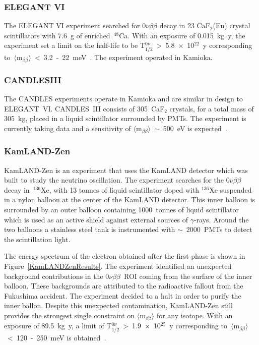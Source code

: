 \documentclass[main.tex]{subfiles}
\begin{document}
\subsubsection{ELEGANT VI}


\NI The ELEGANT VI experiment searched for 0$\nu\beta\beta$ decay in 23 CaF$_\text{2}$(Eu) crystal scintillators with 7.6~g of enriched~$^{\text{48}}$Ca. With an exposure of 0.015~kg~y, the experiment set a limit on the half-life to be T$_{\text{1/2}}^{0\nu}$~>~5.8~$\times$~10$^{\text{22}}$~y corresponding to~$\langle \text{m}_{\beta\beta} \rangle$~<~3.2~-~22~meV~\cite{ELEGANTVI}. The experiment operated in Kamioka. \\


\subsubsection{CANDLESIII}


\NI The CANDLES experiments operate in Kamioka and are similar in design to ELEGANT~VI. CANDLES~III consists of 305~CaF$_\text{2}$ crystals, for a total mass of 305~kg, placed in a liquid scintillator surrounded by PMTs. The experiment is currently taking data and a sensitivity of $\langle \text{m}_{\beta\beta} \rangle$~$\sim$~500~eV is expected~\cite{CANDLESIII}.


\subsubsection{KamLAND-Zen}


\NI KamLAND-Zen is an experiment that uses the KamLAND detector which was built to study the neutrino oscillation. The experiment searches for the 0$\nu\beta\beta$ decay in~$^{\text{136}}$Xe, with 13 tonnes of liquid scintillator doped with $^{\text{136}}$Xe suspended in a nylon balloon at the center of the KamLAND detector. This inner balloon is surrounded by an outer balloon containing 1000~tonnes of liquid scintillator which is used as an active shield against external sources of $\gamma$-rays. Around the two balloons a stainless steel tank is instrumented with $\sim$~2000~PMTs to detect the scintillation light.


\bigskip


\NI The energy spectrum of the electron obtained after the first phase is shown in Figure~\ref{KamLANDZenResults}. The experiment identified an unexpected background contributions in the 0$\nu\beta\beta$~ROI coming from the surface of the inner balloon. These backgrounds are attributed to the radioactive fallout from the Fukushima accident. The experiment decided to a halt in order to purify the inner ballon. Despite this unexpected contamination, KamLAND-Zen still provides the strongest single constraint on $\langle \text{m}_{\beta\beta} \rangle$ for any isotope. With an exposure of 89.5~kg~y, a limit of T$_{\text{1/2}}^{0\nu}$~>~1.9~$\times$~10$^{\text{25}}$~y corresponding to~$\langle \text{m}_{\beta\beta} \rangle$~<~120~-~250~meV is obtained~\cite{KamLAND-Zen}.
\end{document}
